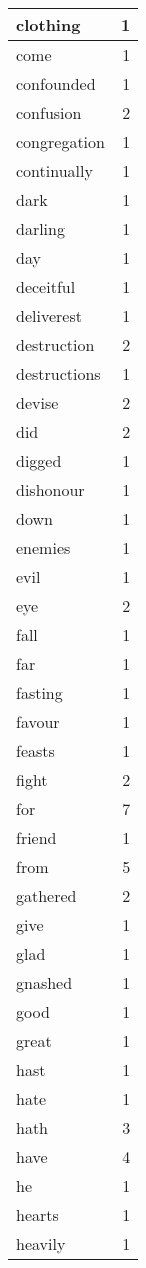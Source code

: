 \begin{center}
\begin{longtable}{l|r}
clothing & 1 \\ \hline
come & 1 \\ \hline
confounded & 1 \\ \hline
confusion & 2 \\ \hline
congregation & 1 \\ \hline
continually & 1 \\ \hline
dark & 1 \\ \hline
darling & 1 \\ \hline
day & 1 \\ \hline
deceitful & 1 \\ \hline
deliverest & 1 \\ \hline
destruction & 2 \\ \hline
destructions & 1 \\ \hline
devise & 2 \\ \hline
did & 2 \\ \hline
digged & 1 \\ \hline
dishonour & 1 \\ \hline
down & 1 \\ \hline
enemies & 1 \\ \hline
evil & 1 \\ \hline
eye & 2 \\ \hline
fall & 1 \\ \hline
far & 1 \\ \hline
fasting & 1 \\ \hline
favour & 1 \\ \hline
feasts & 1 \\ \hline
fight & 2 \\ \hline
for & 7 \\ \hline
friend & 1 \\ \hline
from & 5 \\ \hline
gathered & 2 \\ \hline
give & 1 \\ \hline
glad & 1 \\ \hline
gnashed & 1 \\ \hline
good & 1 \\ \hline
great & 1 \\ \hline
hast & 1 \\ \hline
hate & 1 \\ \hline
hath & 3 \\ \hline
have & 4 \\ \hline
he & 1 \\ \hline
hearts & 1 \\ \hline
heavily & 1 \\ \hline

\end{longtable}
\end{center}
